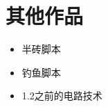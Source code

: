 \section{其他作品}
\begin{maybecols}
\begin{itemize}
\item {} 半砖脚本 
\item {} 钓鱼脚本 
\item {} 1.2之前的电路技术 
\end{itemize}
\end{maybecols}